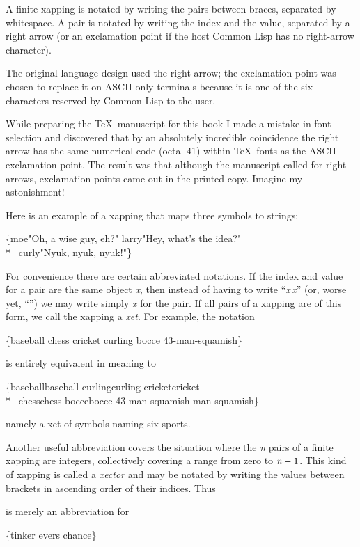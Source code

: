 \begin{defun}[Function]
\begin{new}
A finite xapping is notated by writing the pairs between braces, separated by whitespace.
A pair is notated by writing the index and the value, separated by a right arrow
(or an exclamation point if the host Common Lisp has no right-arrow character).

\beforenoterule
\begin{sideremark}
The original language design used the right arrow; the exclamation point was
chosen to replace it on {ASCII}-only terminals because it is one of
the six characters  reserved by Common Lisp to the user.

While preparing the \TeX\ manuscript for this book I made a mistake
in font selection and discovered that by an absolutely incredible coincidence
the right arrow has the same numerical code (octal 41) within \TeX\ fonts
as the {ASCII} exclamation point.
The result was that although the manuscript called for right arrows,
exclamation points came out in the printed copy.  Imagine my astonishment!
\end{sideremark}
\afternoterule

Here is an example of a xapping that maps three symbols to strings:
\begin{lisp}
\{moe\Xarrowright "Oh, a wise guy, eh?" larry\Xarrowright "Hey, what's the idea?" \\*
 ~curly\Xarrowright "Nyuk, nyuk, nyuk!"\}
\end{lisp}
For convenience there are certain abbreviated notations.
If the index and value for a pair are the same object \emph{x},
then instead of having to write ``\emph{x}\Xarrowright\,\emph{x}''
(or, worse yet, ``'')
we may write simply \emph{x} for the pair.
If all pairs of a xapping are of this form, we call the xapping a \emph{xet}.
For example, the notation
\begin{lisp}
\{baseball chess cricket curling bocce 43-man-squamish\}
\end{lisp}
is entirely equivalent in meaning to
\begin{lisp}
\{baseball\Xarrowright baseball curling\Xarrowright curling cricket\Xarrowright cricket \\*
~chess\Xarrowright chess bocce\Xarrowright bocce 43-man-squamish-man-squamish\}
\end{lisp}
namely a xet of symbols naming six sports.

Another useful abbreviation covers the situation where the \emph{n} pairs of a finite
xapping are integers, collectively covering a range from zero to $\emph{n}-1$.
This kind of xapping is called a \emph{xector} and may be notated by writing
the values between brackets in ascending order of their indices.
Thus
\begin{lisp}
\end{lisp}
is merely an abbreviation for
\begin{lisp}
\{tinker evers chance\}
\end{lisp}


\end{new}
\end{defun}
